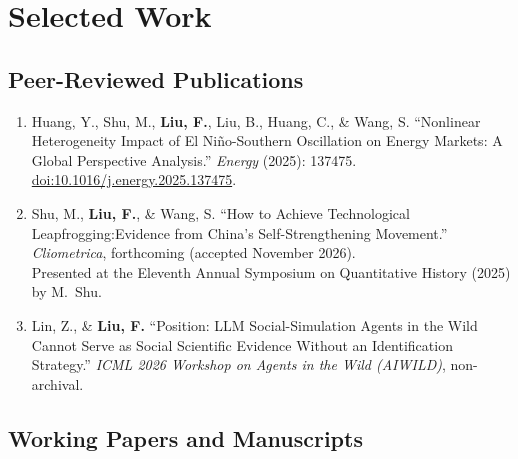 \documentclass[11pt, a4paper]{article}
\begin{document}
\section{Selected Work}

\subsection{Peer-Reviewed Publications}

\begin{enumerate}[leftmargin=1.5em, itemsep=6pt]

  \item Huang, Y., Shu, M., \textbf{Liu, F.}, Liu, B., Huang, C., \& Wang, S.
  ``Nonlinear Heterogeneity Impact of El Ni\~{n}o-Southern Oscillation on Energy
  Markets: A Global Perspective Analysis.''
  \textit{Energy} (2025): 137475.
  \href{https://doi.org/10.1016/j.energy.2025.137475}{doi:10.1016/j.energy.2025.137475}.

  \item Shu, M., \textbf{Liu, F.}, \& Wang, S.
  ``How to Achieve Technological Leapfrogging:\newline Evidence from China's Self-Strengthening Movement.''
  \textit{Cliometrica}, forthcoming (accepted November 2026).\\
  Presented at the Eleventh Annual Symposium on Quantitative History (2025) by M.\ Shu.
  \item Lin, Z., \& \textbf{Liu, F.}
  ``Position: LLM Social-Simulation Agents in the Wild Cannot Serve as
  Social Scientific Evidence Without an Identification Strategy.''
  \textit{ICML 2026 Workshop on Agents in the Wild (AIWILD)}, non-archival.

\end{enumerate}

\subsection{Working Papers and Manuscripts}
\end{document}
